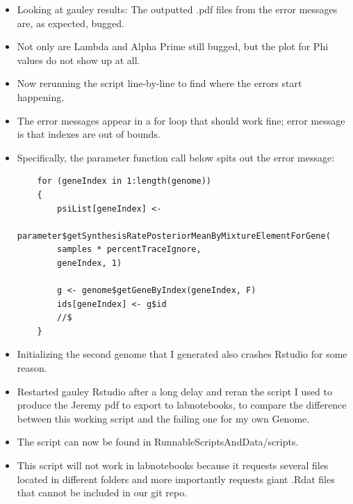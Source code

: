 \documentclass[12pt,hyperref]{labbook}
\begin{document}
\begin{itemize}
    \item Looking at gauley results: The outputted .pdf files from the error messages are, as expected, bugged.
    \item Not only are Lambda and Alpha Prime still bugged, but the plot for Phi values do not show up at all.
    \item Now rerunning the script line-by-line to find where the errors start happening.
    \item The error messages appear in a for loop that should work fine; error message is that indexes are out of bounds.
    \item Specifically, the parameter function call below spits out the error message:
    \begin{lstlisting}
    for (geneIndex in 1:length(genome))
    {
        psiList[geneIndex] <- 
        parameter$getSynthesisRatePosteriorMeanByMixtureElementForGene(
        samples * percentTraceIgnore, 
        geneIndex, 1)

        g <- genome$getGeneByIndex(geneIndex, F)
        ids[geneIndex] <- g$id
        //$
    }
    \end{lstlisting}
    \item Initializing the second genome that I generated also crashes Rstudio for some reason.
    \item Restarted gauley Rstudio after a long delay and reran the script I used to produce the Jeremy pdf to export to labnotebooks, to compare the difference between this working script and the failing one for my own Genome.
    \item The script can now be found in RunnableScriptsAndData/scripts.
    \item This script will not work in labnotebooks because it requests several files located in different folders and more importantly requests giant .Rdat files that cannot be included in our git repo.
\end{itemize}

\end{document}
